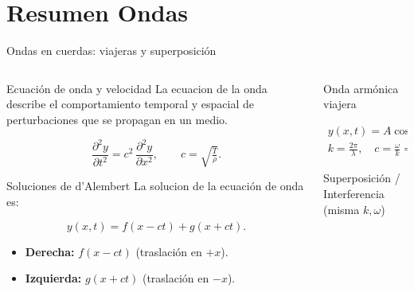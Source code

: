 \documentclass[
    10pt,
    aspectratio=169,
    xcolor={dvipsnames},
    spanish,
    ]{beamer}
\begin{document}
\section{Resumen Ondas}
\begin{frame}{Ondas en cuerdas: viajeras y superposición}
  \footnotesize
  \begin{columns}[T,totalwidth=\textwidth]
    \begin{column}{0.4\textwidth}
      \begin{block}{Ecuación de onda y velocidad}
        La ecuacion de la onda describe el comportamiento temporal y espacial de perturbaciones que se propagan en un medio.
   
        \[
          \frac{\partial^{2}y}{\partial t^{2}}
          = c^{2}\,\frac{\partial^{2}y}{\partial x^{2}},
          \qquad c=\sqrt{\tfrac{T}{\rho}}.
        \]
    
      \end{block}
      \begin{block}{Soluciones de d’Alembert}
        La solucion de la ecuación de onda es:
    
        \[
          y(x,t)=f(x-ct)+g(x+ct).
        \]
        \begin{itemize}
          \item \textbf{Derecha:} $f(x-ct)$ (traslación en $+x$).
          \item \textbf{Izquierda:} $g(x+ct)$ (traslación en $-x$).
        \end{itemize}
     
      \end{block}
    \end{column}
    \begin{column}{0.5\textwidth}
      \begin{block}{Onda armónica viajera}
       
        \begin{align}
          y(x,t)=A\cos(kx-\omega t+\phi)\\
          k=\tfrac{2\pi}{\lambda},\quad c=\tfrac{\omega}{k}=\tfrac{\lambda}{T}
        \end{align}
          
      \end{block}
      \begin{block}{Superposición / Interferencia (misma $k,\omega$)}
      

\end{block}
\end{column}
\end{columns}
\end{frame}
\end{document}
